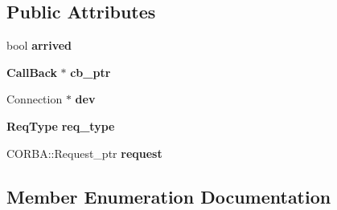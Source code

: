 \subsection*{Public Attributes}
\begin{DoxyCompactItemize}
\item 
bool {\bf arrived}
\item 
{\bf Call\-Back} $\ast$ {\bf cb\-\_\-ptr}
\item 
Connection $\ast$ {\bf dev}
\item 
{\bf Req\-Type} {\bf req\-\_\-type}
\item 
C\-O\-R\-B\-A\-::\-Request\-\_\-ptr {\bf request}
\end{DoxyCompactItemize}


\subsection{Member Enumeration Documentation}
